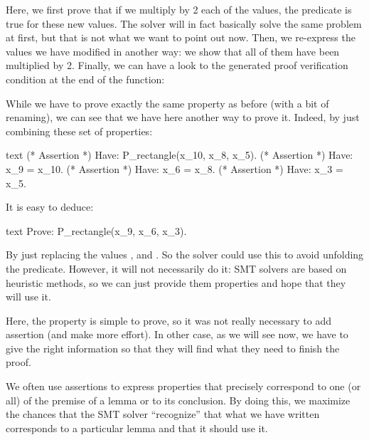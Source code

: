 


Here, we first prove that if we multiply by 2 each of the values, the predicate
is true for these new values. The solver will in fact basically solve the same
problem at first, but that is not what we want to point out now. Then, we
re-express the values we have modified in another way: we show that all of them
have been multiplied by 2. Finally, we can have a look to the generated proof
verification condition at the end of the function:






While we have to prove exactly the same property as before (with a bit of
renaming), we can see that we have here another way to prove it. Indeed, by
just combining these set of properties:


\begin{CodeBlock}{text}
(* Assertion *)
Have: P_rectangle(x_10, x_8, x_5).
(* Assertion *)
Have: x_9 = x_10.
(* Assertion *)
Have: x_6 = x_8.
(* Assertion *)
Have: x_3 = x_5.
\end{CodeBlock}


It is easy to deduce:


\begin{CodeBlock}{text}
Prove: P_rectangle(x_9, x_6, x_3).
\end{CodeBlock}


By just replacing the values ,  and
. So the solver could use this to avoid unfolding the
predicate. However, it will not necessarily do it: SMT solvers are based on
heuristic methods, so we can just provide them properties and hope that they
will use it.



Here, the property is simple to prove, so it was not really necessary to add
assertion (and make more effort). In other case, as we will see now, we have to
give the right information so that they will find what they need to finish the
proof.





We often use assertions to express properties that precisely correspond to one
(or all) of the premise of a lemma or to its conclusion. By doing this, we
maximize the chances that the SMT solver ``recognize'' that what we have written
corresponds to a particular lemma and that it should use it. 



